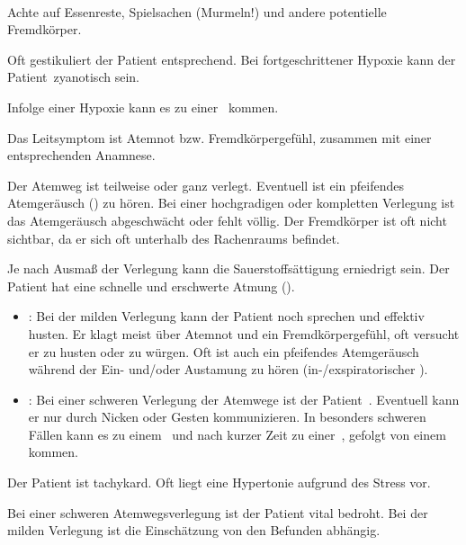 \begin{Synopsis}
\end{Synopsis}

\TextSlide
{\TxABCDE}
{~
\begin{ABCDEText}
  \item[\ABCDE{1}] Achte auf Essenreste, Spielsachen
  (Murmeln!) und andere potentielle Fremdkörper.
  \item[\ABCDE{2}] Oft gestikuliert der Patient
  entsprechend. Bei fortgeschrittener Hypoxie kann der
  Patient {\RedFlag}\,zyanotisch sein.
  \item[\ABCDE{3}] Infolge einer Hypoxie
  kann es zu einer {\RedFlag}\, kommen.
  \item[\ABCDE{4}] Das Leitsymptom ist Atemnot bzw.
  Fremdkörpergefühl, zusammen mit einer entsprechenden
  Anamnese.
  \item[\ABCDE{A}] Der Atemweg ist teilweise oder ganz
  verlegt. Eventuell ist ein pfeifendes Atemgeräusch
  () zu hören. Bei einer hochgradigen
  oder kompletten Verlegung ist das Atemgeräusch
  abgeschwächt oder fehlt völlig. Der Fremdkörper ist oft
  nicht sichtbar, da er sich oft unterhalb des Rachenraums
  befindet. 
  \item[\ABCDE{B}] Je nach Ausmaß der Verlegung kann die
  Sauerstoffsättigung erniedrigt sein. Der Patient hat
  eine schnelle und erschwerte Atmung ().
  \begin{itemize}
  \item {}: Bei
  der milden Verlegung kann der Patient noch sprechen und effektiv husten. Er klagt
  meist über Atemnot und ein Fremdkörpergefühl, oft versucht er zu husten
  oder zu würgen. Oft ist auch ein pfeifendes Atemgeräusch
  während der Ein- und/oder Austamung zu hören
  (in-/exspiratorischer ).
  \item {}:
  Bei einer schweren Verlegung der Atemwege ist der Patient
  {\RedFlag}\,.
  Eventuell kann er nur durch Nic\-k\-en oder Gesten kommunizieren. In besonders
  schweren Fällen kann es zu einem
  {\RedFlag}\, und nach kurzer Zeit zu einer
  {\RedFlag}\,, gefolgt von einem  kommen.
\end{itemize}
  \item[\ABCDE{C}] Der Patient ist tachykard. Oft liegt eine Hypertonie aufgrund des
  Stress vor. 
  \item[\ABCDE{=}] Bei einer schweren Atemwegsverlegung ist
  der Patient vital bedroht. Bei der milden Verlegung ist
  die Einschätzung von den Befunden abhängig.
\end{ABCDEText}
}
